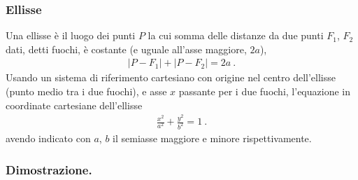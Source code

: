 \documentclass[letterpaper,10pt,italian]{jupyterBook}
\begin{document}
\subsubsection{Ellisse}
\label{\detokenize{ch/analytic_geometry/analytic_geometry_2d/conics-cartesian:ellisse}}
\sphinxAtStartPar
Una ellisse è il luogo dei punti \(P\) la cui somma delle distanze da due punti \(F_1\), \(F_2\) dati, detti fuochi, è costante (e uguale all’asse maggiore, \(2 a\)),
\begin{equation*}
\begin{split}|P - F_1| + |P - F_2| = 2 a \ .\end{split}
\end{equation*}
\sphinxAtStartPar
Usando un sistema di riferimento cartesiano con origine nel centro dell’ellisse (punto medio tra i due fuochi), e asse \(x\) passante per i due fuochi, l’equazione in coordinate cartesiane dell’ellisse
\begin{equation*}
\begin{split}\frac{x^2}{a^2} + \frac{y^2}{b^2} = 1 \ .\end{split}
\end{equation*}
\sphinxAtStartPar
avendo indicato con \(a\), \(b\) il semiasse maggiore e minore rispettivamente.
\subsubsection*{Dimostrazione.}
\end{document}
